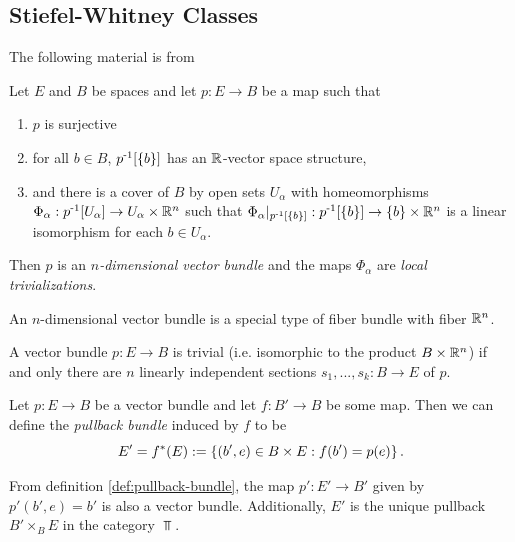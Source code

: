 \subsection{Stiefel-Whitney Classes}\label{sec:bg-stiefel-whitney-classes}
The following material is from \cite{hatcher2009bundlesktheory}

\begin{definition}
    Let $E$ and $B$ be spaces and let $p : E \to B$ be a map such that
    \begin{enumerate}
        \item $p$ is surjective
        \item for all $b \in B$, $p^{\text{-}1}[\left\{ b \right\}]$ has an $\mathbb{R}$-vector space structure,
        \item and there is a cover of $B$ by open sets $U_\alpha$ with homeomorphisms $\Phi_\alpha : p^{\text{-}1}[U_\alpha] \to U_\alpha \times \mathbb{R}^n$ such that $\Phi_\alpha |_{p^{\text{-}1}[\left\{ b \right\}]} : p^{\text{-}1}[\left\{ b \right\}] \to \left\{ b \right\} \times \mathbb{R}^n$ is a linear isomorphism for each $b \in U_\alpha$.
    \end{enumerate}
    Then $p$ is an \emph{$n$-dimensional vector bundle} and the maps $\Phi_\alpha$ are \emph{local trivializations}.
\end{definition}

\begin{remark}
    An $n$-dimensional vector bundle is a special type of fiber bundle with fiber $\mathbb{R}^n$.
\end{remark}

\begin{proposition}\label{prop:trivial-bundle-iff-independent-sections}
    A vector bundle $p : E \to B$ is trivial (i.e. isomorphic to the product $B \times \mathbb{R}^n$) if and only there are $n$ linearly independent sections $s_1,...,s_k : B \to E$ of $p$.
\end{proposition}

\begin{definition}\label{def:pullback-bundle}
    Let $p : E \to B$ be a vector bundle and let $f : B' \to B$ be some map.
    Then we can define the \emph{pullback bundle} induced by $f$ to be
    \[
        E' = f^*(E) := \left\{ (b',e) \in B \times E : f(b') = p(e) \right\}.
    \] 
\end{definition}

\begin{remark}
    From definition \ref{def:pullback-bundle}, the map $p' : E' \to B'$ given by $p'(b',e) = b'$ is also a vector bundle.
    Additionally, $E'$ is the unique pullback $B' \times_{B} E$ in the category $\Top$.
\end{remark}

